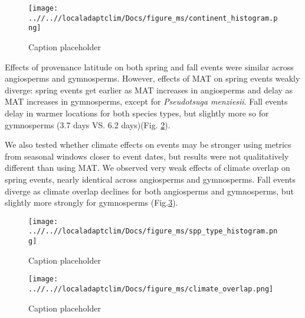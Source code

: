 \documentclass{article}
\begin{document}
\begin{figure}[!h] 
    \centering
 \texttt{[image: ..//..//localadaptclim/Docs/figure\_ms/continent\_histogram.png]}
    \caption{Caption placeholder}
    \label{figure:continent}
\end{figure}

Effects of provenance latitude on both spring and fall events were similar across angiosperms and gymnosperms. However, effects of MAT on spring events weakly diverge: spring events get earlier as MAT increases in angiosperms and delay as MAT increases in gymnosperms, except for \emph{Pseudotsuga menziesii}. Fall events delay in warmer locations for both species types, but slightly more so for gymnosperms (3.7 days VS. 6.2 days)(Fig. \ref{figure:spp_type}).


We also tested whether climate effects on events may be stronger using metrics from seasonal windows closer to event dates, but results were not qualitatively different than using MAT. We observed very weak effects of climate overlap on spring events, nearly identical across angiosperms and gymnosperms. Fall events diverge as climate overlap declines for both angiosperms and gymnosperms, but slightly more strongly for gymnosperms (Fig.\ref{figure:overlap}).

\begin{figure}[!h] 
    \centering
 \texttt{[image: ..//..//localadaptclim/Docs/figure\_ms/spp\_type\_histogram.png]}
    \caption{Caption placeholder}
    \label{figure:spp_type}
\end{figure}


\begin{figure}[!h] 
    \centering
 \texttt{[image: ..//..//localadaptclim/Docs/figure\_ms/climate\_overlap.png]}
    \caption{Caption placeholder}
    \label{figure:overlap}
\end{figure}



\end{document}
